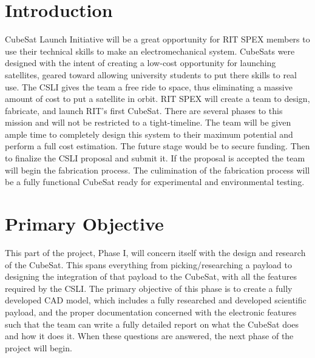 \documentclass[conference]{IEEEtran} %
\begin{document}

\section{Introduction}
\label{sec:introduction}
 CubeSat Launch Initiative will be a great opportunity for RIT SPEX members to use their technical skills to make an electromechanical system.
CubeSats were designed with the intent of creating a low-cost opportunity for launching satellites, geared toward allowing university students to put there skills to
real use. The CSLI gives the team a free ride to space, thus eliminating a massive amount of cost to put a satellite in orbit. RIT SPEX will create a team
to design, fabricate, and launch RIT's first CubeSat. There are several phases to this mission and will not be restricted to a tight-timeline. The team will be given ample
time to completely design this system to their maximum potential and perform a full cost estimation. The future stage would be to secure funding. Then to finalize the CSLI
proposal and submit it. If the proposal is accepted the team will begin the fabrication process. The culimination of the fabrication process will be a
fully functional CubeSat ready for experimental and environmental testing.

\section{Primary Objective}
\label{sec:primary-obj}
This part of the project, Phase I, will concern itself with the design and research of the CubeSat. This spans everything from picking/researching a payload
to designing the integration of that payload to the CubeSat, with all the features required by the CSLI\@. The primary objective of this phase is to create a
fully developed CAD model, which includes a fully researched and developed scientific payload, and the proper documentation concerned with the electronic features such that the team can write a fully detailed report on
what the CubeSat does and how it does it. When these questions are answered, the next phase of the project will begin.
\end{document}
